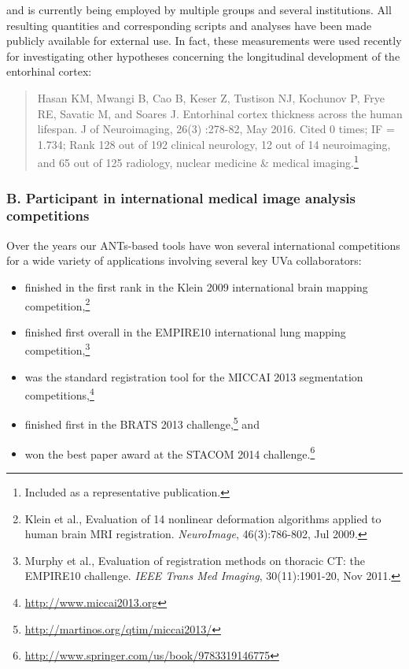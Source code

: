 \documentclass[11pt,]{article}
\let\rmarkdownfootnote\footnote%
\def\footnote{\protect\rmarkdownfootnote}
\begin{document}
and is currently being employed by multiple groups and several
institutions. All resulting quantities and corresponding scripts and
analyses have been made publicly available for external use. In fact,
these measurements were used recently for investigating other hypotheses
concerning the longitudinal development of the entorhinal cortex:

\begin{quote}
Hasan KM, Mwangi B, Cao B, Keser Z, Tustison NJ, Kochunov P, Frye RE,
Savatic M, and Soares J. Entorhinal cortex thickness across the human
lifespan. J of Neuroimaging, 26(3) :278-82, May 2016. Cited 0 times; IF
= 1.734; Rank 128 out of 192 clinical neurology, 12 out of 14
neuroimaging, and 65 out of 125 radiology, nuclear medicine \& medical
imaging.\footnote{Included as a representative publication.}
\end{quote}

\subsubsection{B. Participant in international medical image analysis
competitions}\label{b.-participant-in-international-medical-image-analysis-competitions}

Over the years our ANTs-based tools have won several international
competitions for a wide variety of applications involving several key
UVa collaborators:

\begin{itemize}
\item
  finished in the first rank in the Klein 2009 international brain
  mapping competition,\footnote{Klein et al., Evaluation of 14 nonlinear
    deformation algorithms applied to human brain MRI registration.
    \emph{NeuroImage}, 46(3):786-802, Jul 2009.}
\item
  finished first overall in the EMPIRE10 international lung mapping
  competition,\footnote{Murphy et al., Evaluation of registration
    methods on thoracic CT: the EMPIRE10 challenge. \emph{IEEE Trans Med
    Imaging}, 30(11):1901-20, Nov 2011.}
\item
  was the standard registration tool for the MICCAI 2013 segmentation
  competitions,\footnote{\url{http://www.miccai2013.org}}
\item
  finished first in the BRATS 2013 challenge,\footnote{\url{http://martinos.org/qtim/miccai2013/}}
  and
\item
  won the best paper award at the STACOM 2014 challenge.\footnote{\url{http://www.springer.com/us/book/9783319146775}}
\end{itemize}
\end{document}

